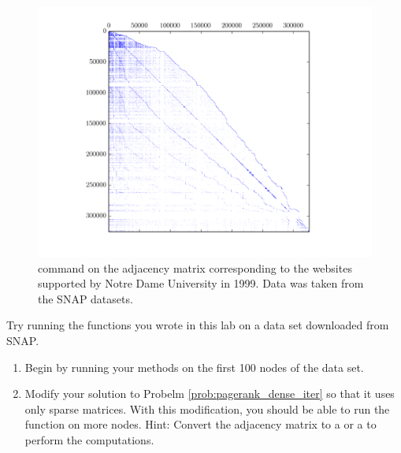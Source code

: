 \begin{figure}
\centering
\includegraphics[width=\textwidth]{sparse_web.png}
\caption{ command on the adjacency matrix corresponding to the websites supported by Notre Dame University in 1999.
Data was taken from the SNAP datasets.}
\label{fig:WebSparse}
\end{figure}

\begin{problem}
Try running the functions you wrote in this lab on a data set downloaded from SNAP.
\begin{enumerate}
\item Begin by running your methods on the first 100 nodes of the data set.
\item Modify your solution to Probelm \ref{prob:pagerank_dense_iter} so that it uses only sparse matrices. 
With this modification, you should be able to run the function on more nodes.
Hint: Convert the adjacency matrix to a  or a  to perform the computations.
\end{enumerate}
\end{problem}
